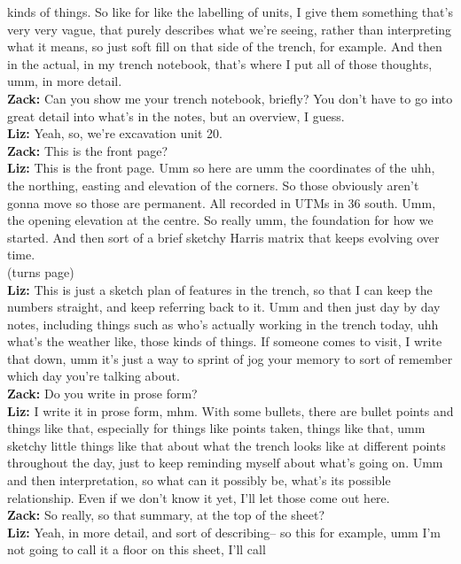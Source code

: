 \documentclass[
]{article}
\begin{document}
kinds of things. So like for like the labelling of units, I give them
something that's very very vague, that purely describes what we're
seeing, rather than interpreting what it means, so just soft fill on
that side of the trench, for example. And then in the actual, in my
trench notebook, that's where I put all of those thoughts, umm, in more
detail.\\
\textbf{Zack:} Can you show me your trench notebook, briefly? You don't
have to go into great detail into what's in the notes, but an overview,
I guess.\\
\textbf{Liz:} Yeah, so, we're excavation unit 20.\\
\textbf{Zack:} This is the front page?\\
\textbf{Liz:} This is the front page. Umm so here are umm the
coordinates of the uhh, the northing, easting and elevation of the
corners. So those obviously aren't gonna move so those are permanent.
All recorded in UTMs in 36 south. Umm, the opening elevation at the
centre. So really umm, the foundation for how we started. And then sort
of a brief sketchy Harris matrix that keeps evolving over time.\\
(turns page)\\
\textbf{Liz:} This is just a sketch plan of features in the trench, so
that I can keep the numbers straight, and keep referring back to it. Umm
and then just day by day notes, including things such as who's actually
working in the trench today, uhh what's the weather like, those kinds of
things. If someone comes to visit, I write that down, umm it's just a
way to sprint of jog your memory to sort of remember which day you're
talking about.\\
\textbf{Zack:} Do you write in prose form?\\
\textbf{Liz:} I write it in prose form, mhm. With some bullets, there
are bullet points and things like that, especially for things like
points taken, things like that, umm sketchy little things like that
about what the trench looks like at different points throughout the day,
just to keep reminding myself about what's going on. Umm and then
interpretation, so what can it possibly be, what's its possible
relationship. Even if we don't know it yet, I'll let those come out
here.\\
\textbf{Zack:} So really, so that summary, at the top of the sheet?\\
\textbf{Liz:} Yeah, in more detail, and sort of describing-- so this for
example, umm I'm not going to call it a floor on this sheet, I'll call
\end{document}
